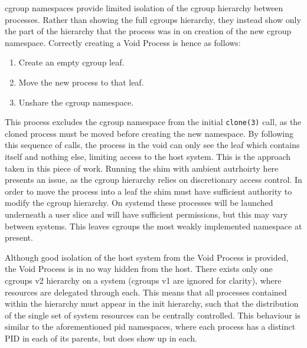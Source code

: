 \documentclass[12pt,a4paper,twoside]{report}
\begin{document}
cgroup namespaces provide limited isolation of the cgroup hierarchy between processes. Rather than showing the full cgroups hierarchy, they instead show only the part of the hierarchy that the process was in on creation of the new cgroup namespace. Correctly creating a Void Process is hence as follows:

\begin{enumerate}
    \item Create an empty cgroup leaf.
    \item Move the new process to that leaf.
    \item Unshare the cgroup namespace.
\end{enumerate}

This process excludes the cgroup namespace from the initial \texttt{clone(3)} call, as the cloned process must be moved before creating the new namespace. By following this sequence of calls, the process in the void can only see the leaf which contains itself and nothing else, limiting access to the host system.  This is the approach taken in this piece of work. Running the shim with ambient autrhoirty here presents an issue, as the cgroup hierarchy relies on discretionary access control. In order to move the process into a leaf the shim must have sufficient authority to modify the cgroup hierarchy. On systemd these processes will be launched underneath a user slice and will have sufficient permissions, but this may vary between systems. This leaves cgroups the most weakly implemented namespace at present.

Although good isolation of the host system from the Void Process is provided, the Void Process is in no way hidden from the host. There exists only one cgroups v2 hierarchy on a system (cgroups v1 are ignored for clarity), where resources are delegated through each. This means that all processes contained within the hierarchy must appear in the init hierarchy, such that the distribution of the single set of system resources can be centrally controlled. This behaviour is similar to the aforementioned pid namespaces, where each process has a distinct PID in each of its parents, but does show up in each.
\end{document}
